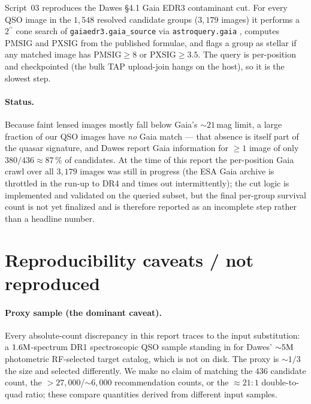 \documentclass[11pt,letterpaper]{article}
\newcommand{\asec}{\ensuremath{^{\prime\prime}}}
\newcommand{\PMSIG}{\ensuremath{\mathrm{PMSIG}}}
\newcommand{\PXSIG}{\ensuremath{\mathrm{PXSIG}}}
\begin{document}
Script~03 reproduces the Dawes \S4.1 Gaia EDR3 \autocite{gaiaedr3}
contaminant cut. For every QSO image in the $1{,}548$ resolved candidate
groups ($3{,}179$ images) it performs a $2\asec$ cone search of
\texttt{gaiaedr3.gaia\_source} via \texttt{astroquery.gaia}
\autocite{astroquery2019}, computes $\PMSIG$ and $\PXSIG$ from the published
formulae, and flags a group as stellar if any matched image has
$\PMSIG \geq 8$ or $\PXSIG \geq 3.5$. The query is per-position and
checkpointed (the bulk TAP upload-join hangs on the host), so it is the
slowest step.

\paragraph{Status.} Because faint lensed images mostly fall below Gaia's
${\sim}21$\,mag limit, a large fraction of our QSO images have \emph{no}
Gaia match --- that absence is itself part of the quasar signature, and
Dawes report Gaia information for $\geq 1$ image of only $380/436
\approx 87\,\%$ of candidates. At the time of this report the per-position
Gaia crawl over all $3{,}179$ images was still in progress (the ESA Gaia
archive is throttled in the run-up to DR4 and times out intermittently);
the cut logic is implemented and validated on the queried subset, but the
final per-group survival count is not yet finalized and is therefore
reported as an incomplete step rather than a headline number.

\section{Reproducibility caveats / not reproduced}

\paragraph{Proxy sample (the dominant caveat).} Every absolute-count
discrepancy in this report traces to the input substitution: a
$1.6{\rm M}$-spectrum DR1 spectroscopic QSO sample standing in for Dawes'
${\sim}5{\rm M}$ photometric RF-selected target catalog, which is not on
disk. The proxy is ${\sim}1/3$ the size and selected differently. We make no
claim of matching the $436$ candidate count, the
${>}27{,}000$/${\sim}6{,}000$ recommendation counts, or the $\approx 21{:}1$
double-to-quad ratio; these compare quantities derived from different input
samples.
\end{document}
